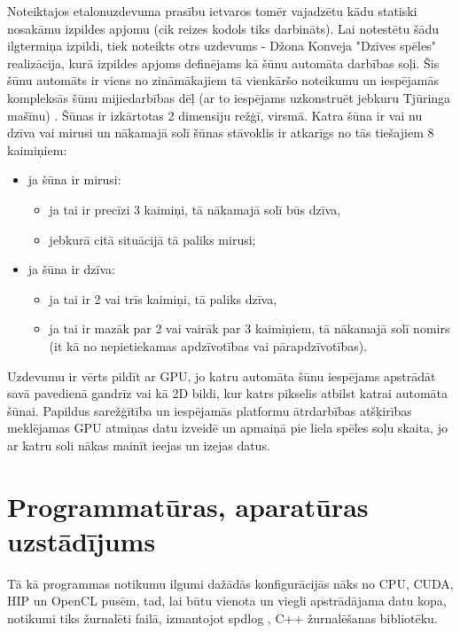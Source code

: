 Noteiktajos etalonuzdevuma prasību ietvaros tomēr vajadzētu kādu statiski
nosakāmu izpildes apjomu (cik reizes kodols tiks darbināts). Lai notestētu šādu
ilgtermiņa izpildi, tiek noteikts otrs uzdevums - Džona Konveja "Dzīves spēles"
\cite{conway1970conway} realizācija, kurā izpildes apjoms definējams kā šūnu
automāta darbības soļi. Šis šūnu automāts ir viens no zināmākajiem tā vienkāršo noteikumu un iespējamās
kompleksās šūnu mijiedarbības dēļ (ar to iespējams uzkonstruēt jebkuru Tjūringa
mašīnu) \cite{conway1970conway}. Šūnas ir izkārtotas 2 dimensiju režģī, virsmā. Katra šūna ir vai nu
dzīva vai mirusi un nākamajā solī šūnas stāvoklis ir atkarīgs no tās tiešajiem
8 kaimiņiem:
\begin{itemize}
    \item ja šūna ir mirusi:
        \begin{itemize}
            \item ja tai ir precīzi 3 kaimiņi, tā nākamajā solī būs dzīva,
            \item jebkurā citā situācijā tā paliks mirusi;
        \end{itemize}
    \item ja šūna ir dzīva:
        \begin{itemize}
            \item ja tai ir 2 vai trīs kaimiņi, tā paliks dzīva,
            \item ja tai ir mazāk par 2 vai vairāk par 3 kaimiņiem,
                tā nākamajā solī nomirs (it kā no nepietiekamas
                apdzīvotības vai pārapdzīvotības).
        \end{itemize}
\end{itemize}

Uzdevumu ir vērts pildīt ar GPU, jo katru automāta šūnu iespējams apstrādāt
savā pavedienā gandrīz vai kā 2D bildi, kur katrs pikselis atbilst katrai
automāta šūnai. Papildus sarežģītība un iespējamās platformu ātrdarbības
atšķirības meklējamas GPU atmiņas datu izveidē un apmaiņā pie liela spēles soļu
skaita, jo ar katru soli nākas mainīt ieejas un izejas datus.


\section{Programmatūras, aparatūras uzstādījums}
Tā kā programmas notikumu ilgumi dažādās konfigurācijās nāks no CPU, CUDA, HIP
un OpenCL pusēm, tad, lai būtu vienota un viegli apstrādājama datu kopa,
notikumi tiks žurnalēti failā, izmantojot spdlog \cite{spdlog-github}, C++
žurnalēšanas bibliotēku.

